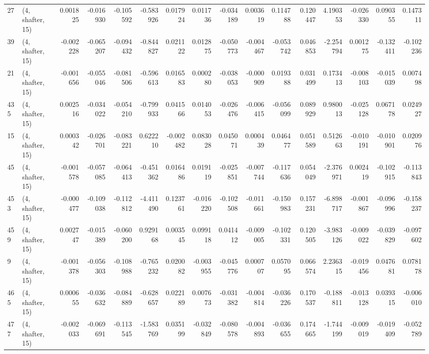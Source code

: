 \begin{tabular}{llrrrrrrrrrrrrrr}
27  &  (4, shafter, 15) &   0.001825 & -0.016930 & -0.105592 &    -0.583926 &   0.017924 &   0.011736 &  -0.034189 &  0.003619 &  0.114788 &  0.120447 &    4.190353 & -0.026330 &  0.090355 &  0.147311 \\
39  &  (4, shafter, 15) &  -0.002228 & -0.065207 & -0.094432 &    -0.844827 &   0.021122 &   0.012875 &  -0.050773 & -0.004467 & -0.053742 &  0.046853 &   -2.254794 &  0.001275 & -0.132411 & -0.102236 \\
21  &  (4, shafter, 15) &  -0.001656 & -0.055046 & -0.081506 &    -0.596613 &   0.016583 &   0.000280 &  -0.038053 & -0.000909 &  0.019388 &  0.031499 &    0.173413 & -0.008103 & -0.015039 &  0.007498 \\
435 &  (4, shafter, 15) &   0.002516 & -0.034022 & -0.054210 &    -0.799933 &   0.041566 &   0.014053 &  -0.026476 & -0.006415 & -0.056099 &  0.089929 &    0.980013 & -0.025128 &  0.067178 &  0.024927 \\
15  &  (4, shafter, 15) &   0.000342 & -0.026701 & -0.083221 &     0.622210 &  -0.002482 &   0.083028 &   0.045071 &  0.000439 &  0.046477 &  0.051589 &    0.512663 & -0.010191 & -0.010901 &  0.020976 \\
45  &  (4, shafter, 15) &  -0.001578 & -0.057085 & -0.064413 &    -0.451362 &   0.016486 &   0.019119 &  -0.025851 & -0.007744 & -0.117636 &  0.054049 &   -2.376971 &  0.002419 & -0.102915 & -0.113843 \\
453 &  (4, shafter, 15) &  -0.000477 & -0.109038 & -0.112812 &    -4.411490 &   0.123761 &  -0.016220 &  -0.102508 & -0.011661 & -0.150983 &  0.157231 &   -6.898717 & -0.001867 & -0.096996 & -0.158237 \\
459 &  (4, shafter, 15) &   0.002747 & -0.015389 & -0.060200 &     0.929168 &   0.003545 &   0.099118 &   0.041412 & -0.009005 & -0.102331 &  0.120505 &   -3.983126 & -0.009022 & -0.039829 & -0.097602 \\
9   &  (4, shafter, 15) &  -0.001378 & -0.056303 & -0.108988 &    -0.765232 &   0.020082 &  -0.003955 &  -0.045776 &  0.000707 &  0.057095 &  0.066574 &    2.236315 & -0.019456 &  0.047681 &  0.078178 \\
465 &  (4, shafter, 15) &   0.000655 & -0.036632 & -0.084889 &    -0.628657 &   0.022189 &   0.007673 &  -0.031382 & -0.004814 & -0.036226 &  0.170537 &   -0.188811 & -0.013128 &  0.039315 & -0.006010 \\
477 &  (4, shafter, 15) &  -0.002033 & -0.069691 & -0.113545 &    -1.583769 &   0.035199 &  -0.032849 &  -0.080578 & -0.004893 & -0.036655 &  0.174665 &   -1.744199 & -0.009019 & -0.019409 & -0.052789 \\

\end{tabular}
